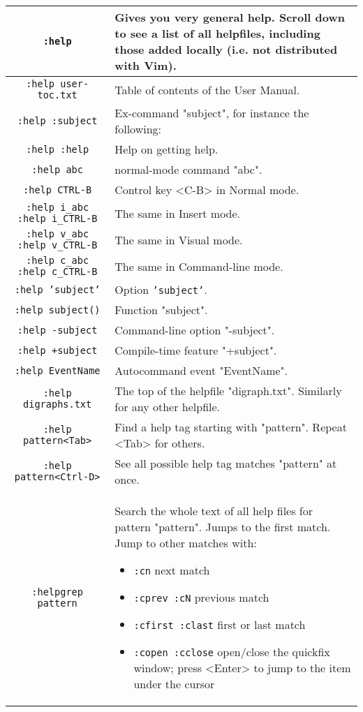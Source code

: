 \begin{tabularx}{\textwidth}{|c | X|}
				\hline
				\texttt{:help} & 
				Gives you very general help.
				Scroll down to see a list of all helpfiles, including those added locally (i.e. not distributed with Vim). \\ \hline
				\texttt{:help user-toc.txt} & Table of contents of the User Manual.\\ \hline
				\texttt{:help :subject} & Ex-command "subject", for instance the following:\\ \hline
				\texttt{:help :help} & Help on getting help.\\ \hline
				\texttt{:help abc} & normal-mode command "abc".\\ \hline
				\texttt{:help CTRL-B} & Control key <C-B> in Normal mode.\\ \hline
				\texttt{:help i\_abc}  \texttt{:help i\_CTRL-B} & The same in Insert mode. \\ \hline
				\texttt{:help v\_abc}  \texttt{:help v\_CTRL-B} & The same in Visual mode. \\ \hline
				\texttt{:help c\_abc}  \texttt{:help c\_CTRL-B} & The same in Command-line mode. \\ \hline
				\texttt{:help 'subject'} & Option \texttt{'subject'}.\\ \hline
				\texttt{:help subject()} & Function "subject".\\ \hline
				\texttt{:help -subject} & Command-line option "-subject".\\ \hline
				\texttt{:help +subject} & Compile-time feature "+subject".\\ \hline
				\texttt{:help EventName} & Autocommand event "EventName".\\ \hline
				\texttt{:help digraphs.txt} & The top of the helpfile "digraph.txt". Similarly for any other helpfile.\\ \hline
				\texttt{:help pattern<Tab>} & Find a help tag starting with "pattern". Repeat <Tab> for others.\\ \hline
				\texttt{:help pattern<Ctrl-D>} & See all possible help tag matches "pattern" at once.\\ \hline
				\texttt{:helpgrep pattern} & Search the whole text of all help files for pattern "pattern".  Jumps to the first match.
				Jump to other matches with:
				\begin{itemize}
								\item \texttt{:cn} next match
								\item \texttt{:cprev :cN} previous match
								\item \texttt{:cfirst :clast} first or last match
								\item \texttt{:copen :cclose} open/close the quickfix window; press <Enter> to jump to the item under the cursor 
				\end{itemize}
				\\ \hline
\end{tabularx}
\clearpage
